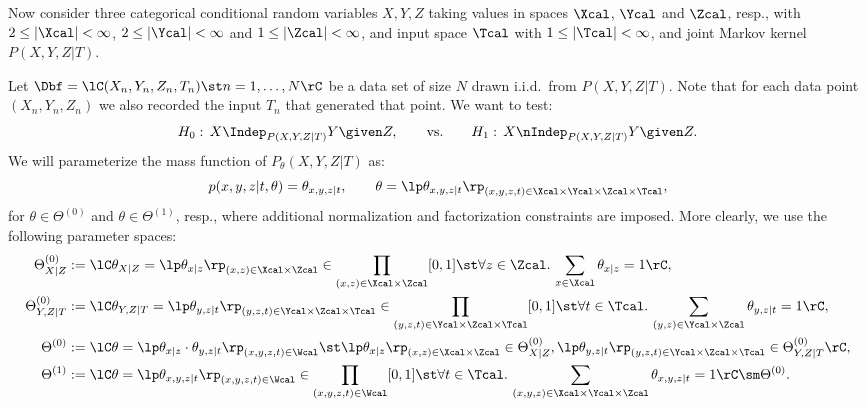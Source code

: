 Now consider three categorical conditional random variables $X,Y,Z$ taking values in spaces $\Xcal$, $\Ycal$
and $\Zcal$, resp., with $2 \le  |\Xcal| < \infty$, $2 \le |\Ycal| < \infty$ and $1 \le |\Zcal| < \infty$, 
and input space $\Tcal$ with $1 \le |\Tcal| < \infty$, 
and joint Markov kernel  $P(X,Y,Z|T)$.

Let $\Dbf=\lC (X_n,Y_n,Z_n,T_n) \st n =1, \dots, N \rC$ be a data set of size $N$ drawn i.i.d.\ from $P(X,Y,Z|T)$.
Note that for each data point $(X_n,Y_n,Z_n)$ we also recorded the input $T_n$ that generated that point.
We want to test:
\[ H_0:\, X \Indep_{P(X,Y,Z|T)} Y \given Z, \qquad \text{vs.} \qquad H_1:\,X \nIndep_{P(X,Y,Z|T)} Y \given Z. \]
We will parameterize the mass function of $P_\theta(X,Y,Z|T)$ as:
\[ p(x,y,z|t,\theta) = \theta_{x,y,z|t}, \qquad \theta = \lp \theta_{x,y,z|t} \rp_{(x,y,z,t) \in \Xcal\times\Ycal\times\Zcal\times\Tcal}, \]
for $\theta \in \Theta^{(0)}$ and $\theta \in \Theta^{(1)}$, resp., where additional normalization and factorization constraints are imposed. 
More clearly, we use the following parameter spaces:
\begin{align*}
    \Theta^{(0)}_{X|Z} &:= \lC \theta_{X|Z} =\lp \theta_{x|z} \rp_{(x,z) \in \Xcal\times\Zcal}  \in \prod_{(x,z) \in \Xcal\times\Zcal} [0,1] \st \forall z \in \Zcal. \, \sum_{x \in \Xcal} \theta_{x|z} =1   \rC,\\
    \Theta^{(0)}_{Y,Z|T} &:= \lC \theta_{Y,Z|T} =\lp \theta_{y,z|t} \rp_{(y,z,t) \in \Ycal\times\Zcal\times\Tcal}  \in \prod_{(y,z,t) \in \Ycal\times\Zcal\times\Tcal} [0,1] \st \forall t \in \Tcal. \, \sum_{(y,z) \in \Ycal\times\Zcal} \theta_{y,z|t} =1   \rC,\\
    \Theta^{(0)} &:= \lC \theta = \lp \theta_{x|z} \cdot \theta_{y,z|t} \rp_{(x,y,z,t) \in\Wcal} \st \lp \theta_{x|z} \rp_{(x,z) \in \Xcal\times\Zcal}  \in \Theta^{(0)}_{X|Z},\lp \theta_{y,z|t} \rp_{(y,z,t) \in \Ycal\times\Zcal\times\Tcal} \in \Theta^{(0)}_{Y,Z|T}  \rC,\\
    \Theta^{(1)} &:= \lC \theta = \lp \theta_{x,y,z|t} \rp_{(x,y,z,t) \in\Wcal} \in \prod_{(x,y,z,t) \in\Wcal}  [0,1]  \st 
    \forall t \in \Tcal. \, \sum_{(x,y,z) \in\Xcal\times\Ycal\times\Zcal} \theta_{x,y,z|t} =1 \rC \sm \Theta^{(0)}.
\end{align*}

